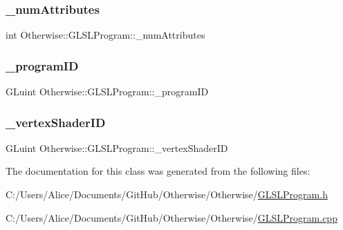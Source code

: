 \subsubsection{\texorpdfstring{\+\_\+num\+Attributes}{\_numAttributes}}
{\footnotesize\ttfamily int Otherwise\+::\+G\+L\+S\+L\+Program\+::\+\_\+num\+Attributes\hspace{0.3cm}{\ttfamily [private]}}

\mbox{\label{class_otherwise_1_1_g_l_s_l_program_abfd84b5a206e36403770f2a207beb0fa}} 
\subsubsection{\texorpdfstring{\+\_\+program\+ID}{\_programID}}
{\footnotesize\ttfamily G\+Luint Otherwise\+::\+G\+L\+S\+L\+Program\+::\+\_\+program\+ID\hspace{0.3cm}{\ttfamily [private]}}

\mbox{\label{class_otherwise_1_1_g_l_s_l_program_a13392933d419cf305911c4a272fa99f0}} 
\subsubsection{\texorpdfstring{\+\_\+vertex\+Shader\+ID}{\_vertexShaderID}}
{\footnotesize\ttfamily G\+Luint Otherwise\+::\+G\+L\+S\+L\+Program\+::\+\_\+vertex\+Shader\+ID\hspace{0.3cm}{\ttfamily [private]}}



The documentation for this class was generated from the following files\+:\begin{DoxyCompactItemize}
\item 
C\+:/\+Users/\+Alice/\+Documents/\+Git\+Hub/\+Otherwise/\+Otherwise/\hyperlink{_g_l_s_l_program_8h}{G\+L\+S\+L\+Program.\+h}\item 
C\+:/\+Users/\+Alice/\+Documents/\+Git\+Hub/\+Otherwise/\+Otherwise/\hyperlink{_g_l_s_l_program_8cpp}{G\+L\+S\+L\+Program.\+cpp}\end{DoxyCompactItemize}
